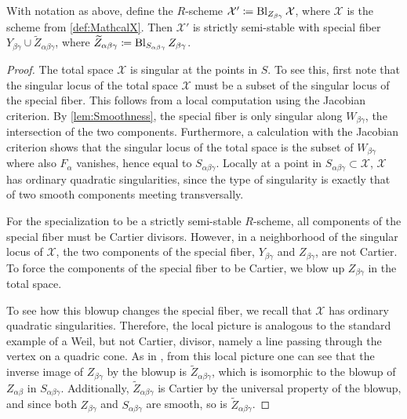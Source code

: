 \begin{lemma}
  \label{lem:XCalPrime}
  With notation as above, define the $R$-scheme $\mathcal{X}' \coloneqq \operatorname{Bl}_{Z_{\beta \gamma}} \mathcal{X}$, where $\mathcal{X}$ is the scheme from \cref{def:MathcalX}. Then $\mathcal{X}'$ is strictly semi-stable with special fiber $Y_{\beta\gamma} \cup \widetilde{Z}_{\alpha\beta\gamma}$, where $\widetilde{Z}_{\alpha\beta\gamma} \coloneqq \operatorname{Bl}_{S_{\alpha \beta \gamma}}Z_{\beta \gamma}$.
\end{lemma}
\begin{proof}
The total space $\mathcal{X}$ is singular at the points in $S$. To see this, first note that the singular locus of the total space $\mathcal{X}$ must be a subset of the singular locus of the special fiber. This follows \eg from a local computation using the Jacobian criterion. By \cref{lem:Smoothness}, the special fiber is only singular along $W_{\beta\gamma}$, the intersection of the two components. Furthermore, a calculation with the Jacobian criterion shows that the singular locus of the total space is the subset of $W_{\beta\gamma}$ where also $F_{\alpha}$ vanishes, hence equal to $S_{\alpha\beta\gamma}$. Locally at a point in $S_{\alpha\beta\gamma} \subset \mathcal{X}$, $\mathcal{X}$ has ordinary quadratic singularities, since the type of singularity is exactly that of two smooth components meeting transversally.

For the specialization to be a strictly semi-stable $R$-scheme, all components of the special fiber must be Cartier divisors. However, in a neighborhood of the singular locus of $\mathscr{X}$, the two components of the special fiber, $Y_{\beta \gamma}$ and $Z_{\beta \gamma}$, are not Cartier. To force the components of the special fiber to be Cartier, we blow up $Z_{\beta \gamma}$ in the total space.

To see how this blowup changes the special fiber, we recall that $\mathcal{X}$ has ordinary quadratic singularities. Therefore, the local picture is analogous to the standard example of a Weil, but not Cartier, divisor, namely a line passing through the vertex on a quadric cone. As in \cite{PavicSchreieder}, from this local picture one can see that the inverse image of $Z_{\beta \gamma}$ by the blowup is $\widetilde{Z}_{\alpha\beta\gamma}$, which is isomorphic to the blowup of $Z_{\alpha \beta}$ in $S_{\alpha \beta \gamma}$. Additionally, $\widetilde{Z}_{\alpha\beta\gamma}$ is Cartier by the universal property of the blowup, and since both $Z_{\beta\gamma}$ and $S_{\alpha\beta\gamma}$ are smooth, so is $\widetilde{Z}_{\alpha\beta\gamma}$.


\end{proof}
